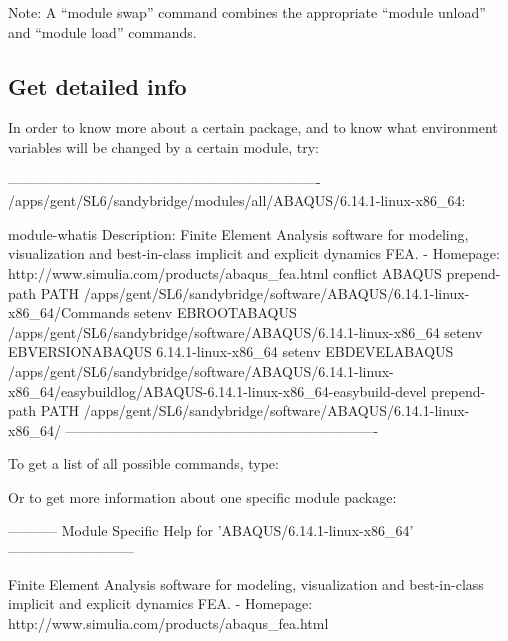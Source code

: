 Note: A ``module swap'' command combines the appropriate ``module unload''
and ``module load'' commands.

\subsection{Get detailed info}

In order to know more about a certain package, and to know what environment
variables will be changed by a certain module, try:

\begin{prompt}
-------------------------------------------------------------------
/apps/gent/SL6/sandybridge/modules/all/ABAQUS/6.14.1-linux-x86_64:

module-whatis    Description: Finite Element Analysis software for modeling, visualization and best-in-class implicit and explicit dynamics FEA. - Homepage: http://www.simulia.com/products/abaqus_fea.html
conflict     ABAQUS
prepend-path PATH /apps/gent/SL6/sandybridge/software/ABAQUS/6.14.1-linux-x86_64/Commands
setenv       EBROOTABAQUS /apps/gent/SL6/sandybridge/software/ABAQUS/6.14.1-linux-x86_64
setenv       EBVERSIONABAQUS 6.14.1-linux-x86_64
setenv       EBDEVELABAQUS /apps/gent/SL6/sandybridge/software/ABAQUS/6.14.1-linux-x86_64/easybuildlog/ABAQUS-6.14.1-linux-x86_64-easybuild-devel
prepend-path PATH /apps/gent/SL6/sandybridge/software/ABAQUS/6.14.1-linux-x86_64/
-------------------------------------------------------------------
\end{prompt}

To get a list of all possible commands, type:

\begin{prompt}
\end{prompt}
Or to get more information about one specific module package:

\begin{prompt}
----------- Module Specific Help for 'ABAQUS/6.14.1-linux-x86_64' ---------------------------

   Finite Element Analysis software for modeling, visualization and best-in-class implicit and explicit dynamics FEA. - Homepage: http://www.simulia.com/products/abaqus_fea.html
\end{prompt}
